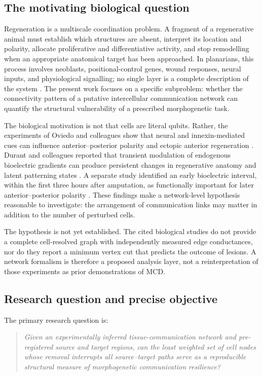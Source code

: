 \documentclass[12pt,a4paper]{article}
\begin{document}
\subsection{The motivating biological question}
Regeneration is a multiscale coordination problem. A fragment of a regenerative animal must establish which structures are absent, interpret its location and polarity, allocate proliferative and differentiative activity, and stop remodelling when an appropriate anatomical target has been approached. In planarians, this process involves neoblasts, positional-control genes, wound responses, neural inputs, and physiological signalling; no single layer is a complete description of the system \citep{Reddien2004,Levin2021}. The present work focuses on a specific subproblem: whether the connectivity pattern of a putative intercellular communication network can quantify the structural vulnerability of a prescribed morphogenetic task.

The biological motivation is not that cells are literal qubits. Rather, the experiments of Oviedo and colleagues show that neural and innexin-mediated cues can influence anterior--posterior polarity and ectopic anterior regeneration \citep{Oviedo2010}. Durant and colleagues reported that transient modulation of endogenous bioelectric gradients can produce persistent changes in regenerative anatomy and latent patterning states \citep{Durant2017}. A separate study identified an early bioelectric interval, within the first three hours after amputation, as functionally important for later anterior--posterior polarity \citep{Durant2019}. These findings make a network-level hypothesis reasonable to investigate: the arrangement of communication links may matter in addition to the number of perturbed cells.

The hypothesis is not yet established. The cited biological studies do not provide a complete cell-resolved graph with independently measured edge conductances, nor do they report a minimum vertex cut that predicts the outcome of lesions. A network formalism is therefore a proposed analysis layer, not a reinterpretation of those experiments as prior demonstrations of MCD.

\subsection{Research question and precise objective}
The primary research question is:
\begin{quote}
\emph{Given an experimentally inferred tissue-communication network and pre-registered source and target regions, can the least weighted set of cell nodes whose removal interrupts all source--target paths serve as a reproducible structural measure of morphogenetic communication resilience?}
\end{quote}
\end{document}
